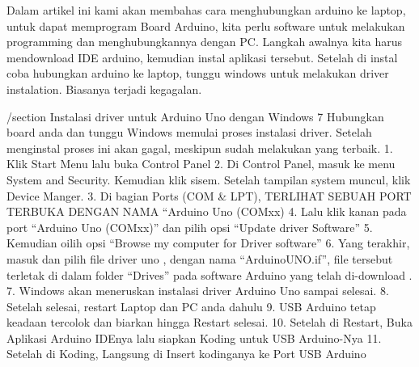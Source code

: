 
Dalam artikel ini kami akan membahas cara menghubungkan arduino ke laptop, untuk dapat memprogram Board Arduino, kita perlu software untuk melakukan programming dan menghubungkannya dengan PC. Langkah awalnya kita harus mendownload IDE arduino, kemudian instal aplikasi tersebut. Setelah di instal coba hubungkan arduino ke laptop, tunggu windows untuk melakukan driver instalation. Biasanya terjadi kegagalan.

/section
Instalasi driver untuk Arduino Uno dengan Windows 7
Hubungkan board anda dan tunggu Windows memulai proses instalasi driver. Setelah menginstal proses ini akan gagal, meskipun sudah melakukan yang terbaik.
1.	Klik Start Menu lalu buka Control Panel
2.	Di Control Panel, masuk ke menu System and Security. Kemudian klik sisem. Setelah tampilan system muncul, klik Device Manger.
3.	Di bagian Ports (COM & LPT), TERLIHAT SEBUAH PORT TERBUKA DENGAN NAMA “Arduino Uno (COMxx)
4.	Lalu klik kanan pada port “Arduino Uno (COMxx)” dan pilih opsi “Update driver Software”
5.	Kemudian oilih opsi “Browse my computer for Driver software”
6.	Yang terakhir, masuk dan pilih file driver uno , dengan nama “ArduinoUNO.if”, file tersebut terletak di dalam folder “Drives” pada software Arduino yang telah di-download .
7.	Windows akan meneruskan instalasi driver Arduino Uno sampai selesai.
8.  Setelah selesai, restart Laptop dan PC anda dahulu
9.  USB Arduino tetap keadaan tercolok dan biarkan hingga Restart selesai.
10. Setelah di Restart, Buka Aplikasi Arduino IDEnya lalu siapkan Koding untuk USB Arduino-Nya
11. Setelah di Koding, Langsung di Insert kodinganya ke Port USB Arduino
